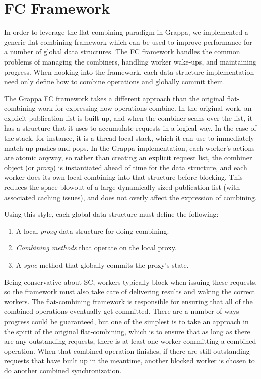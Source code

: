 \section{FC Framework}
In order to leverage the flat-combining paradigm in Grappa, we implemented a generic flat-combining framework which can be used to improve performance for a number of global data structures. The FC framework handles the common problems of managing the combiners, handling worker wake-ups, and maintaining progress. When hooking into the framework, each data structure implementation need only define how to combine operations and globally commit them.

The Grappa FC framework takes a different approach than the original flat-combining work for expressing how operations combine. In the original work, an explicit publication list is built up, and when the combiner scans over the list, it has a structure that it uses to accumulate requests in a logical way. In the case of the stack, for instance, it is a thread-local stack, which it can use to immediately match up pushes and pops. In the Grappa implementation, each worker's actions are atomic anyway, so rather than creating an explicit request list, the combiner object (or \emph{proxy}) is instantiated ahead of time for the data structure, and each worker does its own local combining into that structure before blocking. This reduces the space blowout of a large dynamically-sized publication list (with associated caching issues), and does not overly affect the expression of combining.

Using this style, each global data structure must define the following:
\begin{enumerate}
  \item A local \emph{proxy} data structure for doing combining.
  \item \emph{Combining methods} that operate on the local proxy.
  \item A \emph{sync} method that globally commits the proxy's state.
\end{enumerate}

Being conservative about SC, workers typically block when issuing these requests, so the framework must also take care of delivering results and waking the correct workers. The flat-combining framework is responsible for ensuring that all of the combined operations eventually get committed. There are a number of ways progress could be guaranteed, but one of the simplest is to take an approach in the spirit of the original flat-combining, which is to ensure that as long as there are any outstanding requests, there is at least one worker committing a combined operation. When that combined operation finishes, if there are still outstanding requests that have built up in the meantime, another blocked worker is chosen to do another combined synchronization.

